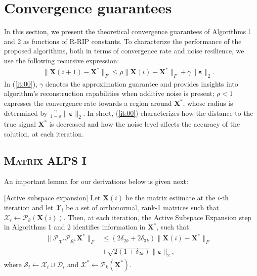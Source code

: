 \documentclass[twocolumn]{svjour3}
\newcommand{\vectornorm}[1]{\|#1\|}
\newcommand{\vectornormbig}[1]{\big\|#1\big\|}
\newcommand{\signal}{\boldsymbol{X}}
\newcommand{\bestsignal}{\boldsymbol{X}^\ast}
\newcommand{\xtrue}{\bestsignal}
\newcommand{\noise}{\boldsymbol{\varepsilon}}
\newcommand{\rank}{k}
\begin{document}
\section{Convergence guarantees}{\label{section:convergence}}

In this section, we present the theoretical convergence guarantees of Algorithms 1 and 2 as functions of R-RIP constants. 
To characterize the performance of the proposed algorithms, both in terms of convergence rate and noise resilience, we use the following recursive expression:
\begin{align}
\vectornorm{\signal(i+1) - \xtrue}_F \leq \rho \vectornorm{\signal(i) - \xtrue}_F + \gamma \vectornorm{\noise}_2. \label{it:00}
\end{align} In (\ref{it:00}), $ \gamma $ denotes the approximation guarantee and provides insights into algorithm's reconstruction capabilities when additive noise is present; $ \rho < 1 $ expresses the convergence rate towards a region around $ \xtrue $, whose radius is determined by $ \frac{\gamma}{1-\rho} \vectornorm{\noise}_2 $. In short, (\ref{it:00}) characterizes how the distance to the true signal $ \bestsignal $ is decreased and how the noise level affects the accuracy of the solution, at each iteration.

\subsection{\textsc{Matrix ALPS I}}
An important lemma for our derivations below is given next:

\begin{lemma}\label{lemma:act_subspace_exp}[Active subspace expansion] Let $ \signal(i) $ be the matrix estimate at the $ i $-th iteration and let $ \mathcal{X}_i $ be a set of orthonormal, rank-1 matrices such that $ \mathcal{X}_i \leftarrow \mathcal{P}_{\rank}(\signal(i)) $.  Then, at each iteration, the Active Subspace Expansion step in Algorithms 1 and 2 identifies information in $ \bestsignal $, such that:
\begin{align}
\vectornormbig{\mathcal{P}_{\mathcal{X}^\ast} \mathcal{P}_{\mathcal{S}_i^{\bot}}\bestsignal}_F &\leq (2\delta_{2\rank} + 2\delta_{3\rank})\vectornormbig{\signal(i) - \bestsignal}_F \nonumber \\ &+ \sqrt{2(1+\delta_{2\rank})}\vectornormbig{\noise}_2, \label{eq:lemma6}
\end{align} where $ \mathcal{S}_i \leftarrow \mathcal{X}_i \cup \mathcal{D}_i $ and $ \mathcal{X}^\ast \leftarrow \mathcal{P}_{\rank}(\bestsignal) $.
\end{lemma}
\end{document}
